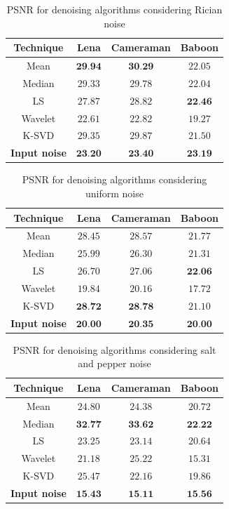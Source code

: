 \begin{table}[H]
	\centering
	\caption{PSNR for denoising algorithms considering Rician noise}
	\begin{tabular}{|c|c|c|c|}
	\hline
	\textbf{Technique} & \textbf{Lena} & \textbf{Cameraman} & \textbf{Baboon} \\ \hline
	Mean & $\textbf{29.94}$ & $\textbf{30.29}$ & $22.05$ \\ \hline
	Median & $29.33$ & $29.78$ & $22.04$ \\ \hline
	LS & $27.87$ & $28.82$ & $\textbf{22.46}$ \\ \hline
	Wavelet & $22.61$ & $22.82$ & $19.27$ \\ \hline
	K-SVD & $29.35$  & $29.87$ & $21.50$ \\ \hline
	\textbf{Input noise} & $\textbf{23.20}$ & $\textbf{23.40}$ & $\textbf{23.19}$ \\ \hline
	\end{tabular}
	\label{tab:numerical_results_rician}
\end{table}

\begin{table}[H]
	\centering
	\caption{PSNR for denoising algorithms considering uniform noise}
	\begin{tabular}{|c|c|c|c|}
	\hline
	\textbf{Technique} & \textbf{Lena} & \textbf{Cameraman} & \textbf{Baboon} \\ \hline
	Mean & $28.45$ & $28.57$ & $21.77$ \\ \hline
	Median & $25.99$ & $26.30$ & $21.31$ \\ \hline
	LS & $26.70$ & $27.06$ & $\textbf{22.06}$ \\ \hline
	Wavelet & $19.84$ & $20.16$ & $17.72$\\ \hline
	K-SVD & $\textbf{28.72}$ & $\textbf{28.78}$ & $21.10$ \\ \hline
	\textbf{Input noise} & $\textbf{20.00}$ & $\textbf{20.35}$ & $\textbf{20.00}$ \\ \hline
	\end{tabular}
	\label{tab:numerical_results_uniform}
\end{table}

\begin{table}[H]
	\centering
	\caption{PSNR for denoising algorithms considering salt and pepper noise}
	\begin{tabular}{|c|c|c|c|}
	\hline
	\textbf{Technique} & \textbf{Lena} & \textbf{Cameraman} & \textbf{Baboon} \\ \hline
	Mean & $24.80$ & $24.38$ & $20.72$ \\ \hline
	Median & $\textbf{32.77}$ & $\textbf{33.62}$ & $\textbf{22.22}$\\ \hline
	LS & $23.25$ & $23.14$ & $20.64$ \\ \hline
	Wavelet & $21.18$ & $25.22$ & $15.31$\\ \hline
	K-SVD & $25.47$  & $22.16$ & $19.86$ \\ \hline
	\textbf{Input noise} & $\textbf{15.43}$ & $\textbf{15.11}$ & $\textbf{15.56}$ \\ \hline
	\end{tabular}
	\label{tab:numerical_results_sp}
\end{table}


